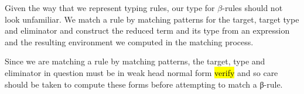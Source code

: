 Given the way that we represent typing rules, our type for $β$-rules
should not look unfamiliar. We match a rule by matching patterns for the
target, target type and eliminator and construct the reduced term
and its type from an expression and the resulting environment we
computed in the matching process.

Since we are matching a rule by matching patterns, the target, type and
eliminator in question must be in weak head normal form \hl{verify} and
so care should be taken to compute these forms before attempting to match
a β-rule.
\begin{code}%
\>[0]\AgdaSpace{}%
\AgdaSpace{}%
\AgdaSymbol{:}\AgdaSpace{}%
\AgdaSpace{}%
\<%
\\
\>[0][@{}l@{\AgdaIndent{0}}]%
\>[2]\<%
\\
\>[2][@{}l@{\AgdaIndent{0}}]%
\>[4]\AgdaSpace{}%
\AgdaSpace{}%
\AgdaSpace{}%
\AgdaSymbol{:}\AgdaSpace{}%
\AgdaSpace{}%
\<%
\\
%
\>[4]\AgdaSpace{}%
\AgdaSpace{}%
\AgdaSymbol{:}\AgdaSpace{}%
\AgdaSpace{}%
\AgdaSymbol{(}\AgdaSpace{}%
\AgdaSpace{}%
\AgdaSpace{}%
\AgdaSpace{}%
\AgdaSymbol{)}\AgdaSpace{}%
\<%
\\
%
\\[\AgdaEmptyExtraSkip]%
%
\>[2]\AgdaSpace{}%
\AgdaSpace{}%
\AgdaSpace{}%
\AgdaSymbol{(}\AgdaOperator{\AgdaFunction{\AgdaUnderscore{}>>=\AgdaUnderscore{}}}\AgdaSymbol{)}\<%
\\
%
\\[\AgdaEmptyExtraSkip]%
%
\>[2]\AgdaSpace{}%
\AgdaSymbol{:}\AgdaSpace{}%
\AgdaSymbol{\{}\AgdaSpace{}%
\AgdaSymbol{:}\AgdaSpace{}%
\AgdaSymbol{\}}\AgdaSpace{}%
\AgdaSpace{}%
\<%
\\
%
\>[2]\AgdaSpace{}%
\AgdaSymbol{\{}\AgdaSymbol{\}}\AgdaSpace{}%
\AgdaSymbol{=}%
\>[140I]\AgdaSymbol{((}\AgdaSpace{}%
\AgdaSpace{}%
\AgdaSymbol{)}%
\>[36]\<%

\end{code}
